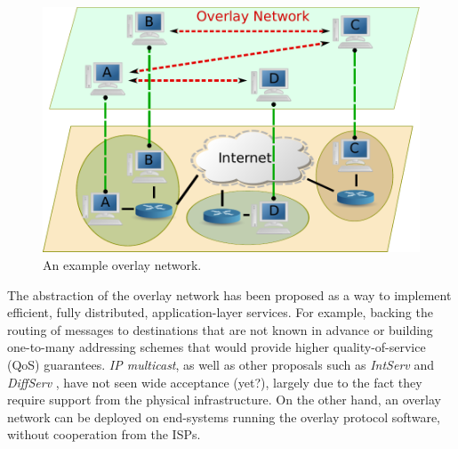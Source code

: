 \documentclass[acmcsur,acmnow]{acmtrans2m}
\begin{document}
\begin{figure}
\centering
  \includegraphics[scale=0.5]{img/p2p.pdf}
\caption{An example overlay network.}
\label{figure:overlay}
\end{figure}

The abstraction of the overlay network has been proposed as a way to implement efficient, fully distributed, application-layer services. For example, backing the routing of messages to destinations that are not known in advance or building one-to-many addressing schemes
that would provide higher quality-of-service (QoS) guarantees. \emph{IP multicast}, as well as other proposals such as \emph{IntServ} and \emph{DiffServ} \cite{cisco_diffserv_2005}, have not seen wide acceptance (yet?), largely due to the fact they require support from the physical infrastructure. On the other hand, an overlay network can be deployed on end-systems running the overlay protocol software, without cooperation from the ISPs.

\end{document}
